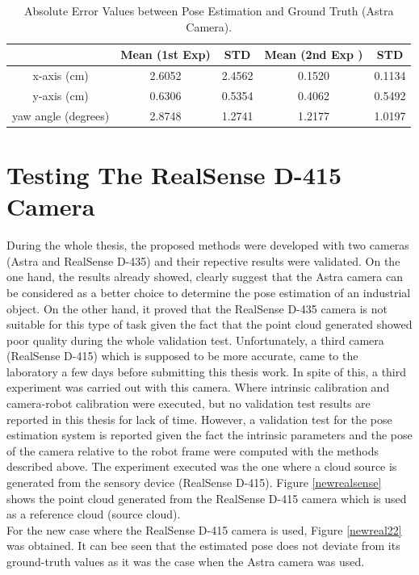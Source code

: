 \begin{table}[ht]
\renewcommand{\arraystretch}{1.3}
\caption{Absolute Error Values between Pose Estimation and Ground Truth (Astra Camera).}
\label{absolute}
\centering
\begin{tabular}{|c|c|c|c|c|}
\hline
  & Mean (1st Exp)& STD &  Mean (2nd Exp )& STD \\
\hline
x-axis (cm) & 2.6052 & 2.4562 & 0.1520 & 0.1134\\
\hline
y-axis (cm) & 0.6306 & 0.5354 & 0.4062 & 0.5492\\
\hline
yaw angle (degrees)& 2.8748 & 1.2741 & 1.2177 & 1.0197\\
\hline
\end{tabular}
\end{table}

\section{Testing The RealSense D-415 Camera} \label{thirds}

During the whole thesis, the proposed methods were developed with two cameras (Astra and RealSense D-435) and their repective results were validated. On the one hand, the results already showed, clearly suggest that the Astra camera can be considered as a better choice to determine the pose estimation of an industrial object. On the other hand, it proved that the RealSense D-435 camera is not suitable for this type of task given the fact that the point cloud generated showed poor quality during the whole validation test. Unfortunately, a third camera (RealSense D-415) which is supposed to be more accurate, came to the laboratory a few days before submitting this thesis work. In spite of this, a third experiment was carried out with this camera. Where intrinsic calibration and camera-robot calibration were executed, but no validation test results are reported in this thesis for lack of time. However, a validation test for the pose estimation system is reported given the fact the intrinsic parameters and the pose of the camera relative to the robot frame were computed with the methods described above. The experiment executed was the one where a cloud source is generated from the sensory device (RealSense D-415). Figure \ref{newrealsense} shows the point cloud generated from the RealSense D-415 camera which is used as a reference cloud (source cloud).\\
For the new case where the RealSense D-415 camera is used, Figure \ref{newreal22} was obtained. It can bee seen that the estimated pose does not deviate from its ground-truth values as it was the case when the Astra camera was used.


